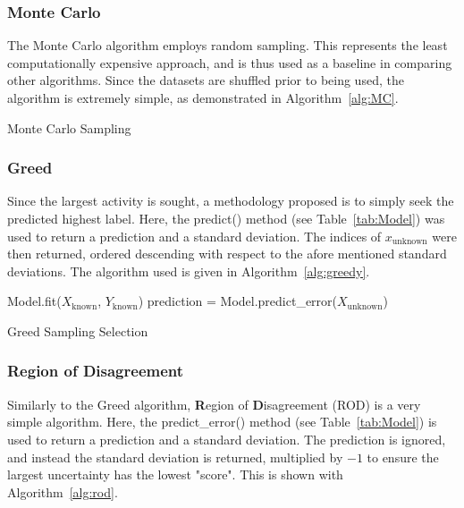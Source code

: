 \subsubsection{Monte Carlo}
The Monte Carlo algorithm employs random sampling. This represents the least computationally expensive approach, and is thus used as a baseline in comparing other algorithms. Since the datasets are shuffled prior to being used, the algorithm is extremely simple, as demonstrated in Algorithm~\ref{alg:MC}.

\begin{algorithm}[H]
  \caption{Monte Carlo Sampling}
  \label{alg:MC}\SetAlgoLined
\end{algorithm}

\subsubsection{Greed}
Since the largest activity is sought, a methodology proposed is to simply seek the predicted highest label. Here, the predict() method (see Table~\ref{tab:Model}) was used to return a prediction and a standard deviation. The indices of $x_\mathrm{unknown}$ were then returned, ordered descending with respect to the afore mentioned standard deviations. The algorithm used is given in Algorithm~\ref{alg:greedy}.

\begin{algorithm}[H]
  Model.fit($X_\mathrm{known}$, $Y_\mathrm{known}$)\;
  prediction = Model.predict\_error($X_\mathrm{unknown}$)\;
  \caption{Greed Sampling Selection}
  \label{alg:greedy}\SetAlgoLined
\end{algorithm}

\subsubsection{Region of Disagreement}
Similarly to the Greed algorithm, \textbf{R}egion of \textbf{D}isagreement (ROD) is a very simple algorithm. Here, the predict\_error() method (see Table~\ref{tab:Model}) is used to return a prediction and a standard deviation. The prediction is ignored, and instead the standard deviation is returned, multiplied by $-1$ to ensure the largest uncertainty has the lowest "score". This is shown with Algorithm~\ref{alg:rod}.

